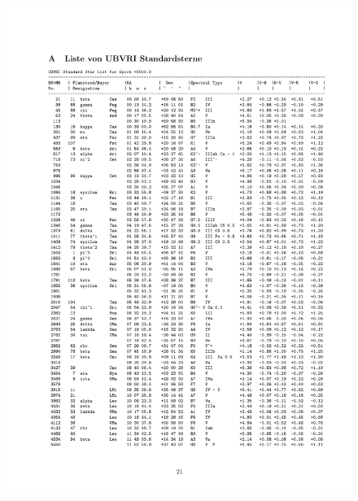 \documentclass[a4paper, 11pt, fleqn]{memoir}
\begin{document}
\begin{figure}
    \centering \includegraphics[width=14cm]{standardsterne_ubvri1} \caption*{} \label{}
\end{figure}
\end{document}
